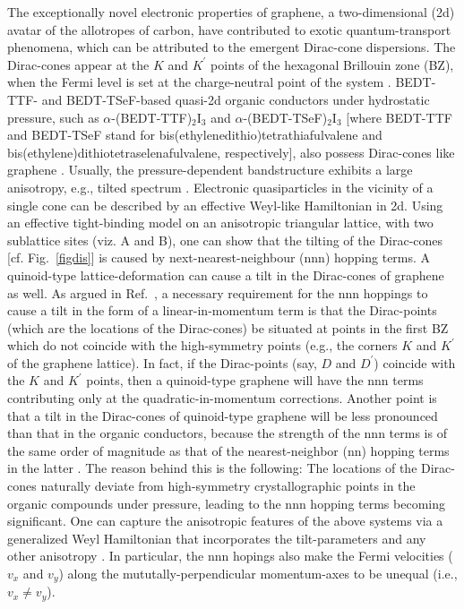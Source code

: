 \documentclass[aps,prb, onecolumn,nofootinbib,citeautoscript,10pt]{revtex4-2}
\begin{document}
The exceptionally novel electronic properties of graphene, a two-dimensional (2d) avatar of the allotropes of carbon, have contributed to exotic quantum-transport phenomena, which can be attributed to the emergent Dirac-cone dispersions. The Dirac-cones appear at the $K$ and $K^\prime $ points of the hexagonal Brillouin zone (BZ), when the Fermi level is set at the charge-neutral point of the system \cite{graphene-review}. BEDT-TTF- and BEDT-TSeF-based quasi-2d organic conductors under hydrostatic pressure, such as $\alpha$-(BEDT-TTF)$_2$I$_3$ and $\alpha$-(BEDT-TSeF)$_2$I$_3$ [where BEDT-TTF and BEDT-TSeF stand for bis(ethylenedithio)tetrathiafulvalene and bis(ethylene)dithiotetraselenafulvalene, respectively], also possess Dirac-cones like graphene \cite{organic-tilted-dirac, organic-dirac}. Usually, the pressure-dependent bandstructure exhibits a large anisotropy, e.g., tilted spectrum \cite{organic-tilted-dirac}. Electronic quasiparticles in the vicinity of a single cone can be described by an effective Weyl-like Hamiltonian in 2d. Using an effective tight-binding model on an anisotropic triangular lattice, with two sublattice sites (viz. A and B), one can show that the tilting of the Dirac-cones [cf. Fig.~\ref{figdis}] is caused by next-nearest-neighbour (nnn) hopping terms. A quinoid-type lattice-deformation can cause a tilt in the Dirac-cones of graphene as well. As argued in Ref.~\cite{tilted-goerbig}, a necessary requirement for the nnn hoppings to cause a tilt in the form of a linear-in-momentum term is that the Dirac-points (which are the locations of the Dirac-cones) be situated at points in the first BZ which do not coincide with the high-symmetry points (e.g., the corners $K$ and $K^\prime$ of the graphene lattice). In fact, if the Dirac-points (say, $D$ and $D^\prime $) coincide with the $K$ and $K^\prime$ points, then a quinoid-type graphene will have the nnn terms contributing only at the quadratic-in-momentum corrections.
Another point is that a tilt in the Dirac-cones of quinoid-type graphene will be less pronounced than that in the organic conductors, because the strength of the nnn terms is of the same order of magnitude as that of the nearest-neighbor (nn) hopping terms in the latter \cite{tilted-goerbig}. The reason behind this is the following: The locations of the Dirac-cones naturally deviate from high-symmetry crystallographic points in the organic compounds under pressure, leading to the nnn hopping terms becoming significant. One can capture the anisotropic features of the above systems via a generalized Weyl Hamiltonian that incorporates the tilt-parameters and any other anisotropy \cite{tilted-goerbig-plasmons, strained-dirac-franz, ips_tilted_dirac}. In particular, the nnn hopings also make the Fermi velocities ($v_x $ and $ v_y$) along the mututally-perpendicular momentum-axes to be unequal (i.e., $ v_x \neq v_y$).
\end{document}
